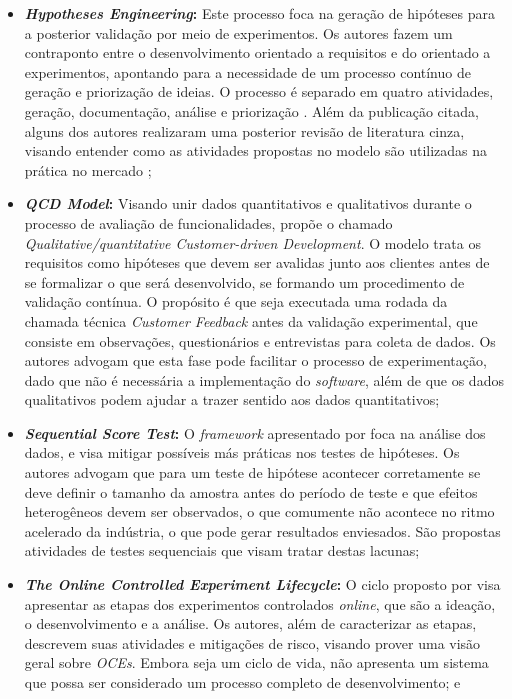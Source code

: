 \begin{itemize}
    
    \item \textbf{\textit{Hypotheses Engineering}:} Este processo foca na geração de hipóteses para a posterior validação por meio de experimentos. Os autores fazem um contraponto entre o desenvolvimento orientado a requisitos e do orientado a experimentos, apontando para a necessidade de um processo contínuo de geração e priorização de ideias. O processo é separado em quatro atividades, geração, documentação, análise e priorização \cite{melegati_hypotheses_2019}. Além da publicação citada, alguns dos autores realizaram uma posterior revisão de literatura cinza, visando entender como as atividades propostas no modelo são utilizadas na prática no mercado \cite{melegati_understanding_2021};

    \item \textbf{\textit{QCD Model}:} Visando unir dados quantitativos e qualitativos durante o processo de avaliação de funcionalidades,  propõe o chamado \textit{Qualitative/quantitative Customer-driven Development}. O modelo trata os requisitos como hipóteses que devem ser avalidas junto aos clientes antes de se formalizar o que será desenvolvido, se formando um procedimento de validação contínua. O propósito é que seja executada uma rodada da chamada técnica \textit{Customer Feedback} antes da validação experimental, que consiste em observações, questionários e entrevistas para coleta de dados. Os autores advogam que esta fase pode facilitar o processo de experimentação, dado que não é necessária a implementação do \textit{software}, além de que os dados qualitativos podem ajudar a trazer sentido aos dados quantitativos;
    
    \item \textbf{\textit{Sequential Score Test}:} O \textit{framework} apresentado por \cite{yu_new_2020} foca na análise dos dados, e visa mitigar possíveis más práticas nos testes de hipóteses. Os autores advogam que para um teste de hipótese acontecer corretamente se deve definir o tamanho da amostra antes do período de teste e que efeitos heterogêneos devem ser observados, o que comumente não acontece no ritmo acelerado da indústria, o que pode gerar resultados enviesados. São propostas atividades de testes sequenciais que visam tratar destas lacunas;
    
    \item \textbf{\textit{The Online Controlled Experiment Lifecycle}:} O ciclo proposto por  visa apresentar as etapas dos experimentos controlados \textit{online}, que são a ideação, o desenvolvimento e a análise. Os autores, além de caracterizar as etapas, descrevem suas atividades e mitigações de risco, visando prover uma visão geral sobre \textit{OCEs}. Embora seja um ciclo de vida, não apresenta um sistema que possa ser considerado um processo completo de desenvolvimento; e
    

\end{itemize}
